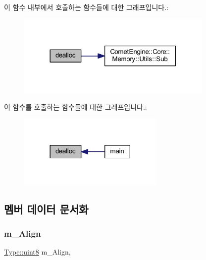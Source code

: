 이 함수 내부에서 호출하는 함수들에 대한 그래프입니다.\+:\nopagebreak
\begin{figure}[H]
\begin{center}
\leavevmode
\includegraphics[width=270pt]{class_comet_engine_1_1_core_1_1_memory_1_1_free_list_allocator_ab7a97e4b1500c7ef2c2edc3bec28a84f_cgraph}
\end{center}
\end{figure}
이 함수를 호출하는 함수들에 대한 그래프입니다.\+:\nopagebreak
\begin{figure}[H]
\begin{center}
\leavevmode
\includegraphics[width=201pt]{class_comet_engine_1_1_core_1_1_memory_1_1_free_list_allocator_ab7a97e4b1500c7ef2c2edc3bec28a84f_icgraph}
\end{center}
\end{figure}


\subsection{멤버 데이터 문서화}
\mbox{\label{class_comet_engine_1_1_core_1_1_memory_1_1_base_allocator_a01f973630e3c1ac98b9defda193793b8}} 
\subsubsection{\texorpdfstring{m\+\_\+\+Align}{m\_Align}}
{\footnotesize\ttfamily \hyperlink{namespace_comet_engine_1_1_type_a1b09856a6463f2bcc4bd8ff0e4e3ee0f}{Type\+::uint8} m\+\_\+\+Align\hspace{0.3cm}{\ttfamily [protected]}, {\ttfamily [inherited]}}



